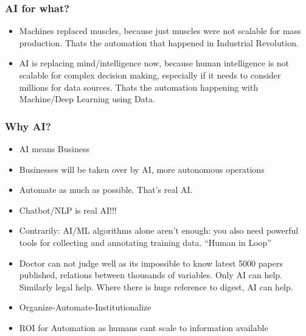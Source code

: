 \begin{frame}[fragile]\frametitle{AI for what?}
\begin{itemize}
\item Machines replaced muscles, because just muscles were not scalable for mass production. Thats the automation that happened in Industrial Revolution.
\item AI is replacing mind/intelligence now, because human intelligence is not scalable for complex decision making, especially if it needs to consider millions for data sources. Thats the automation happening with Machine/Deep Learning using Data.
\end{itemize}
\end{frame}

\begin{frame}[fragile]\frametitle{Why AI?}
\begin{itemize}
\item AI means Business
\item Businesses will be taken over by AI, more autonomous operations
\item Automate as much as possible. That's real AI. 
\item Chatbot/NLP is real AI!!!
\item Contrarily: AI/ML algorithms alone aren’t enough: you also need powerful tools for collecting and annotating training data. ``Human in Loop''
\item Doctor can not judge well as its impossible to know latest 5000 papers published, relations between thousands of variables. Only AI can help. Similarly legal help. Where there is huge reference to digest, AI can help.
\item Organize-Automate-Institutionalize
\item ROI for Automation as humans cant scale to information available
\end{itemize}
\end{frame}

